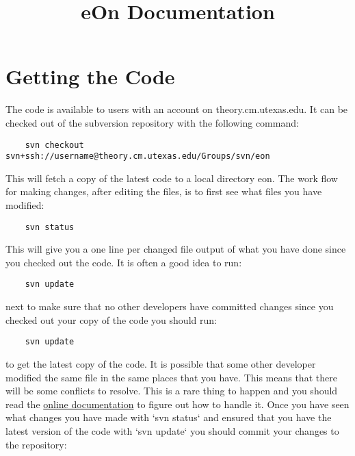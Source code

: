 \documentclass{article}
\begin{document}
\title{eOn Documentation}
\maketitle
\section{Getting the Code}
The code is available to users with an account on theory.cm.utexas.edu. It can
be checked out of the subversion repository with the following command:
\begin{verbatim}
    svn checkout svn+ssh://username@theory.cm.utexas.edu/Groups/svn/eon 
\end{verbatim}
This will fetch a copy of the latest code to a local directory eon.
The work flow for making changes, after editing the files, is to first see what
files you have modified:
\begin{verbatim}
    svn status
\end{verbatim}
This will give you a one line per changed file output of what you have done
since you checked out the code. It is often a good idea to run:
\begin{verbatim}
    svn update
\end{verbatim}
next to make sure that no other developers have committed changes since you
checked out your copy of the code you should run:
\begin{verbatim}
    svn update
\end{verbatim}
to get the latest copy of the code. It is possible that some other developer
modified the same file in the same places that you have. This means that there
will be some conflicts to resolve. This is a rare thing to happen and you
should read the \href{http://svnbook.red-bean.com/en/1.5/index.html}{online documentation} to figure out how to handle it. Once you have seen what changes you have made with `svn status` and ensured that you have the latest version of the code with `svn update` you should commit your changes to the repository:
\begin{verbatim}
    svn commit -m "a brief message describing your changes"
\end{verbatim}

\section{Introduction}

\section{Input Files}
Three input files are required to run an akmc simulation. The config.ini file
which sets the options for the server code. The parameters.dat file which is
passed on to the client and the initial configuration of the chemical system to
be modeled.
\end{document}
